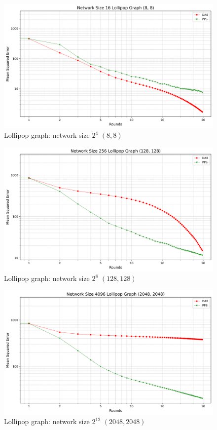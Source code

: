 \begin{figure}[H]
    \centering
    \includegraphics[scale=0.5]{figures/lollipopGraphSimulations/DAB_vs_PPS_LG_r50_n16.png}
    \caption{Lollipop graph: network size $2^{4}$ $(8, 8)$}
    \label{fig:8+8lollipop}
\end{figure}

\begin{figure}[H]
    \centering
    \includegraphics[scale=0.5]{figures/lollipopGraphSimulations/DAB_vs_PPS_LG_r50_n256.png}
    \caption{Lollipop graph: network size $2^{8}$ $(128, 128)$}
    \label{fig:128+128lollipop}
\end{figure}

\begin{figure}[H]
    \centering
    \includegraphics[scale=0.5]{figures/lollipopGraphSimulations/DAB_vs_PPS_LG_r50_n4096.png}
    \caption{Lollipop graph: network size $2^{12}$ $(2048, 2048)$}
    \label{fig:2048+2048lollipop}
\end{figure}

